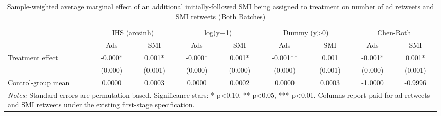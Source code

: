\begin{table}[!htbp]
\centering
\caption{Sample-weighted average marginal effect of an additional initially-followed SMI being assigned to treatment on number of ad retweets and SMI retweets (Both Batches)}
\begin{tabular}{lcccccccc}
\hline
 & \multicolumn{2}{c}{IHS (arcsinh)} & \multicolumn{2}{c}{log(y+1)} & \multicolumn{2}{c}{Dummy (y>0)} & \multicolumn{2}{c}{Chen-Roth} \\
 & Ads & SMI & Ads & SMI & Ads & SMI & Ads & SMI \\
\hline
Treatment effect & -0.000* & 0.001* & -0.000* & 0.001* & -0.001** & 0.001 & -0.001* & 0.001* \\
 & (0.000) & (0.001) & (0.000) & (0.000) & (0.000) & (0.001) & (0.000) & (0.001) \\
Control-group mean & 0.0000 & 0.0003 & 0.0000 & 0.0002 & 0.0000 & 0.0003 & -1.0000 & -0.9996 \\
\hline
\multicolumn{9}{l}{\parbox[t]{15.5cm}{\textit{Notes:} Standard errors are permutation-based. Significance stars: * p<0.10, ** p<0.05, *** p<0.01. Columns report paid-for-ad retweets and SMI retweets under the existing first-stage specification.}} \\
\end{tabular}
\end{table}
